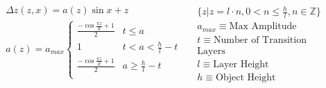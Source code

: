 \documentclass[border={1pt 1pt 1pt 1pt}]{standalone}
\begin{document}
$
	\begin{array}{c|c}
		\begin{matrix}
			\Delta z(z,x)=a(z)\sin{x} + z\\
			a(z) = a_{max}
				\begin{cases}
					\frac{-\cos{\frac{\pi z}{lt}}+1}{2} & t \leq a\\
					1 & t < a < \frac{h}{l}-t\\
					\frac{-\cos{\frac{\pi z}{lt}}+1}{2} & a \geq \frac{h}{l}-t\\
				\end{cases}\\
			
		\end{matrix}
		&
		\begin{matrix}
			\{z|z=l\cdot n, 0 < n \leq \frac{h}{l}, n\in \mathbb{Z}\}\\
			a_{max} \equiv \text{Max Amplitude}\\
			t \equiv \text{Number of Transition}\\ \text{Layers}\\
			l \equiv \text{Layer Height}\\
			h \equiv \text{Object Height}
		\end{matrix}
	\end{array}
$
\end{document}
